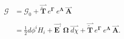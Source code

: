 \begin{equation}
\begin{aligned}
\mathcal{G}&=\mathcal{G}_{0}+\overset{\rightharpoonup }{\widetilde{\mathbf{T}}}\:e
^{\mathbf{\Gamma }}\:e^{\mathbf{\Lambda }}\:\overset{\rightharpoonup
}{\mathbf{A}}\\
\\
&=\frac{1}{2}d\phi ^{i}H_{i}+\overset{\rightharpoonup }{\mathbf{E}%
^{\prime }}\:\mathbf{\Omega }\:\overset{\rightharpoonup }{d\chi }+%
\overset{\rightharpoonup }{\widetilde{\mathbf{T}}}\:e^{\mathbf{\Gamma
}}\:e^{\mathbf{\Lambda }}\:\overset{\rightharpoonup }{\mathbf{A}}.
\end{aligned}
\end{equation}

